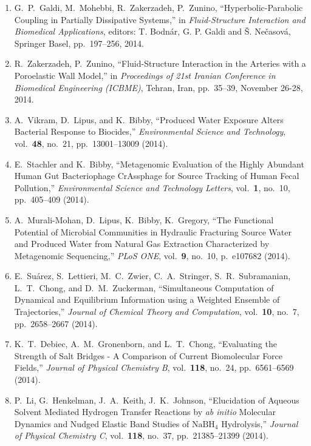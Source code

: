 \begin{enumerate}
\item G.\ P.\ Galdi, M.\ Mohebbi, R.\ Zakerzadeh, P.\ Zunino, ``Hyperbolic-Parabolic Coupling in Partially Dissipative Systems,'' in   \textit{Fluid-Structure Interaction and Biomedical Applications}, editors: T. Bodn\'{a}r, G. P. Galdi and \v{S}. Ne\v{c}asov\'{a}, Springer Basel, pp.\ 197--256, 2014.

\item R.\ Zakerzadeh, P.\ Zunino, ``Fluid-Structure Interaction in the   Arteries with a Poroelastic Wall Model,'' in \textit{Proceedings of 21st    Iranian Conference in Biomedical Engineering (ICBME)}, Tehran, Iran, pp.\ 35--39, November 26-28, 2014.

\item A.\ Vikram, D.\ Lipus, and K.\ Bibby, ``Produced Water Exposure Alters Bacterial Response to Biocides,'' \textit{Environmental Science and Technology}, vol.\ \textbf{48}, no.\ 21, pp.\ 13001--13009 (2014).

\item E.\ Stachler and K.\ Bibby, ``Metagenomic Evaluation of the Highly Abundant Human Gut Bacteriophage CrAssphage for Source Tracking of Human Fecal Pollution,'' \textit{Environmental Science and Technology Letters}, vol.\ \textbf{1}, no.\ 10, pp.\ 405--409 (2014).

\item A.\ Murali-Mohan, D.\ Lipus, K.\ Bibby, K.\ Gregory, ``The Functional Potential of Microbial Communities in Hydraulic Fracturing Source Water and Produced Water from Natural Gas Extraction Characterized by Metagenomic Sequencing,'' \textit{PLoS ONE}, vol.\ \textbf{9}, no.\ 10, p.\ e107682 (2014).

\item E.\ Su\'{a}rez, S.\ Lettieri, M.\ C.\ Zwier, C.\ A.\ Stringer, S.\ R.\ Subramanian, L.\ T.\ Chong, and D.\ M.\ Zuckerman, ``Simultaneous Computation of Dynamical and Equilibrium Information using a Weighted Ensemble of Trajectories,'' \textit{Journal of Chemical Theory and Computation}, vol.\ \textbf{10}, no.\ 7, pp.\ 2658--2667 (2014).

\item K.\ T.\ Debiec, A.\ M.\ Gronenborn, and L.\ T.\ Chong, ``Evaluating the Strength of Salt Bridges - A Comparison of Current Biomolecular Force Fields,'' \textit{Journal of Physical Chemistry B}, vol.\ \textbf{118}, no.\ 24, pp.\ 6561--6569 (2014).

\item P.\ Li, G.\ Henkelman, J.\ A.\ Keith, J.\ K.\ Johnson, ``Elucidation of Aqueous Solvent Mediated Hydrogen Transfer Reactions by \textit{ab initio} Molecular Dynamics and Nudged Elastic Band Studies of $\mathrm{Na}\mathrm{B}\mathrm{H}_4$ Hydrolysis,'' \textit{Journal of Physical Chemistry C}, vol.\ \textbf{118}, no.\ 37, pp.\ 21385--21399 (2014).


\end{enumerate}
